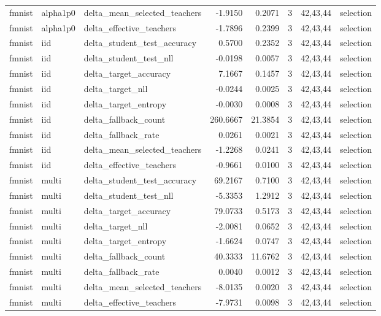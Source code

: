 \begin{tabular}{lllrrrll}
fmnist & alpha1p0 & delta\_mean\_selected\_teachers & -1.9150 & 0.2071 & 3 & 42,43,44 & selection \\
fmnist & alpha1p0 & delta\_effective\_teachers & -1.7896 & 0.2399 & 3 & 42,43,44 & selection \\
fmnist & iid & delta\_student\_test\_accuracy & 0.5700 & 0.2352 & 3 & 42,43,44 & selection \\
fmnist & iid & delta\_student\_test\_nll & -0.0198 & 0.0057 & 3 & 42,43,44 & selection \\
fmnist & iid & delta\_target\_accuracy & 7.1667 & 0.1457 & 3 & 42,43,44 & selection \\
fmnist & iid & delta\_target\_nll & -0.0244 & 0.0025 & 3 & 42,43,44 & selection \\
fmnist & iid & delta\_target\_entropy & -0.0030 & 0.0008 & 3 & 42,43,44 & selection \\
fmnist & iid & delta\_fallback\_count & 260.6667 & 21.3854 & 3 & 42,43,44 & selection \\
fmnist & iid & delta\_fallback\_rate & 0.0261 & 0.0021 & 3 & 42,43,44 & selection \\
fmnist & iid & delta\_mean\_selected\_teachers & -1.2268 & 0.0241 & 3 & 42,43,44 & selection \\
fmnist & iid & delta\_effective\_teachers & -0.9661 & 0.0100 & 3 & 42,43,44 & selection \\
fmnist & multi & delta\_student\_test\_accuracy & 69.2167 & 0.7100 & 3 & 42,43,44 & selection \\
fmnist & multi & delta\_student\_test\_nll & -5.3353 & 1.2912 & 3 & 42,43,44 & selection \\
fmnist & multi & delta\_target\_accuracy & 79.0733 & 0.5173 & 3 & 42,43,44 & selection \\
fmnist & multi & delta\_target\_nll & -2.0081 & 0.0652 & 3 & 42,43,44 & selection \\
fmnist & multi & delta\_target\_entropy & -1.6624 & 0.0747 & 3 & 42,43,44 & selection \\
fmnist & multi & delta\_fallback\_count & 40.3333 & 11.6762 & 3 & 42,43,44 & selection \\
fmnist & multi & delta\_fallback\_rate & 0.0040 & 0.0012 & 3 & 42,43,44 & selection \\
fmnist & multi & delta\_mean\_selected\_teachers & -8.0135 & 0.0020 & 3 & 42,43,44 & selection \\
fmnist & multi & delta\_effective\_teachers & -7.9731 & 0.0098 & 3 & 42,43,44 & selection \\

\end{tabular}
